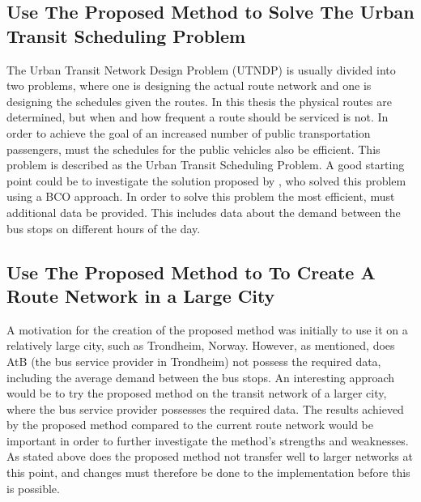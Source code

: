 \subsection*{Use The Proposed Method to Solve The Urban Transit Scheduling Problem}
The Urban Transit Network Design Problem (UTNDP) is usually divided into two problems, where one is designing the actual route network and one is designing the schedules given the routes. In this thesis the physical routes are determined, but when and how frequent a route should be serviced is not. In order to achieve the goal of an increased number of public transportation passengers, must the schedules for the public vehicles also be efficient. This problem is described as the Urban Transit Scheduling Problem. A good starting point could be to investigate the solution proposed by \citet{nikolic14}, who solved this problem using a BCO approach. In order to solve this problem the most efficient, must additional data be provided. This includes data about the demand between the bus stops on different hours of the day. 

\subsection*{Use The Proposed Method to To Create A Route Network in a Large City}
A motivation for the creation of the proposed method was initially to use it on a relatively large city, such as Trondheim, Norway. However, as mentioned, does AtB (the bus service provider in Trondheim) not possess the required data, including the average demand between the bus stops. An interesting approach would be to try the proposed method on the transit network of a larger city, where the bus service provider possesses the required data. The results achieved by the proposed method compared to the current route network would be important in order to further investigate the method's strengths and weaknesses. As stated above does the proposed method not transfer well to larger networks at this point, and changes must therefore be done to the implementation before this is possible. 






